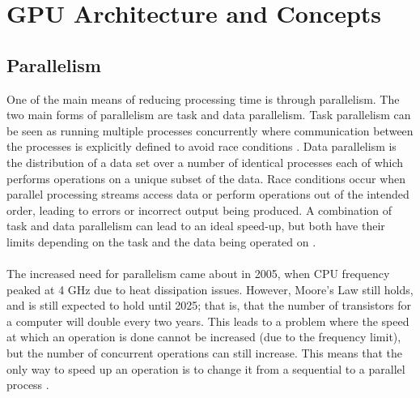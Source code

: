 \section{GPU Architecture and Concepts}\label{gpu}
\subsection{Parallelism}\label{gpu:sec:par}
One of the main means of reducing processing time is through parallelism. The two main forms of parallelism are task and data parallelism. Task parallelism can be seen as running multiple processes concurrently where communication between the processes is explicitly defined to avoid race conditions \citep{subhlok1993exploiting}. Data parallelism is the distribution of a data set over a number of identical processes each of which performs operations on a unique subset of the data. Race conditions occur when parallel processing streams access data or perform operations out of the intended order, leading to errors or incorrect output being produced. A combination of task and data parallelism can lead to an ideal speed-up, but both have their limits depending on the task and the data being operated on \citep{subhlok1993exploiting}.
\\
\\
The increased need for parallelism came about in 2005, when CPU frequency peaked at 4 GHz due to heat dissipation issues. However, Moore's Law \citep{moore2006cramming} still holds, and is still expected to hold until 2025; that is, that the number of transistors for a computer will double every two years. This leads to a problem where the speed at which an operation is done cannot be increased (due to the frequency limit), but the number of concurrent operations can still increase. This means that the only way to speed up an operation is to change it from a sequential to a parallel process \citep{rajan2013informatics}.
